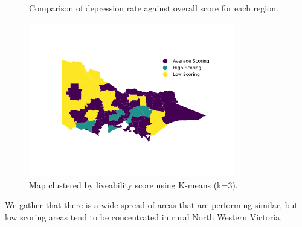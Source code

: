 \documentclass[a4, 11pt]{article}
\begin{document}
\begin{figure}[h]
    \captionsetup[subfigure]{labelformat=empty}
    \centering
    \caption{Comparison of depression rate against overall score for each region.}
\end{figure}

\begin{figure}[h]
    \centering
    \includegraphics[width=0.8\textwidth]{./plots/kmeansminMax.png}
    \caption{Map clustered by liveability score using K-means (k=3).}
    \label{fig:my_label}
\end{figure}

We gather that there is a wide spread of areas that are performing similar, but low scoring areas tend to be concentrated in rural North Western Victoria.
\end{document}

